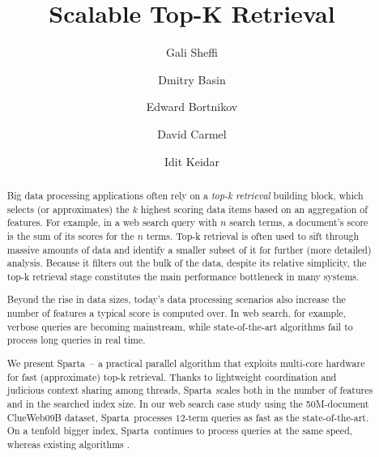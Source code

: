 \documentclass[sigplan,10pt,review,anonymous]{acmart}
\title{Scalable Top-K Retrieval}
\author{Gali Sheffi}%
\author{Dmitry Basin}%
\author{Edward Bortnikov}%
\author{David Carmel}%
\author{Idit Keidar}%
\newcommand{\alg}{Sparta}
\newcommand{\inred}[1]{{\color{red}{#1}}}
\begin{document}
\begin{abstract}



Big data processing applications often rely on a \emph{top-k retrieval} building block, which selects (or approximates) the $k$ highest scoring data items based on an 
aggregation of features. For example, in a web search query with $n$ search terms, a document's score is the sum 
of its  scores for the $n$ terms. Top-k  retrieval is often  used to sift through massive amounts of data and identify a smaller subset of it for 
further (more detailed) analysis. Because it filters out the bulk of the data, despite its relative simplicity, the top-k retrieval stage constitutes the main performance bottleneck
in many systems.  

Beyond the rise in data  sizes, today's 
data processing scenarios also increase the number of features a typical score is computed over. 
In web search, for example, %
verbose queries are becoming mainstream,  
while state-of-the-art algorithms fail to process  long queries in real time. 

We present \alg\ -- a practical parallel algorithm that exploits multi-core hardware for fast (approximate) top-k retrieval. 
Thanks to lightweight coordination and judicious context sharing among  threads,
\alg\ scales both in the number of features and in the searched index size. 
In our web search case study using 
the 50M-document  ClueWeb09B 
dataset, \alg\  processes $12$-term  queries \inred{twice} as fast as  the state-of-the-art. 
On a tenfold  bigger index, 
\alg\ continues to process queries at the same speed, whereas existing algorithms 
\inred{deteriorate significantly}.
\end{abstract}


\maketitle








\clearpage

  
\end{document}
